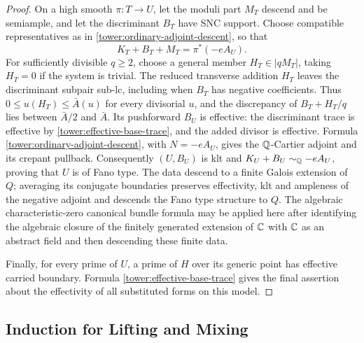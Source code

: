 \begin{proof}
On a high smooth $\pi:T\to U$, let the moduli part $M_T$ descend
and be semiample, and let the discriminant $B_T$ have SNC support.
Choose compatible representatives as in
\eqref{tower:ordinary-adjoint-descent}, so that
\[
 K_T+B_T+M_T=\pi^*(-eA_U).
\]
For sufficiently divisible $q\ge2$, choose a general member
$H_T\in|qM_T|$, taking $H_T=0$ if the system is trivial.
The reduced transverse addition $H_T$ leaves the discriminant
subpair sub-lc, including when $B_T$ has negative coefficients.
Thus $0\le u(H_T)\le\bar A(u)$ for every divisorial $u$, and
the discrepancy of $B_T+H_T/q$ lies between $\bar A/2$ and
$\bar A$.  Its pushforward $B_U$ is effective: the discriminant
trace is effective by \eqref{tower:effective-base-trace}, and
the added divisor is effective.  Formula
\eqref{tower:ordinary-adjoint-descent}, with $N=-eA_U$, gives
the $\mathbb Q$-Cartier adjoint and its crepant pullback.  Consequently
$(U,B_U)$ is klt and $K_U+B_U\sim_{\mathbb Q}-eA_U$, proving that
$U$ is of Fano type.
The data descend to a finite Galois
extension of $Q$; averaging its conjugate boundaries preserves
effectivity, klt and ampleness of the negative adjoint and descends
the Fano type structure to $Q$.  The algebraic characteristic-zero
canonical bundle formula may be applied here after identifying
the algebraic closure of the finitely generated extension of
$\mathbb C$ with $\mathbb C$ as an abstract field and then descending these
finite data.

Finally, for every prime of $U$, a prime of $H$ over its generic
point has effective carried boundary.  Formula
\eqref{tower:effective-base-trace} gives the final assertion about
the effectivity of all substituted forms on this model.
\end{proof}

\enlargethispage{-\baselineskip}
\subsection{Induction for Lifting and Mixing}

